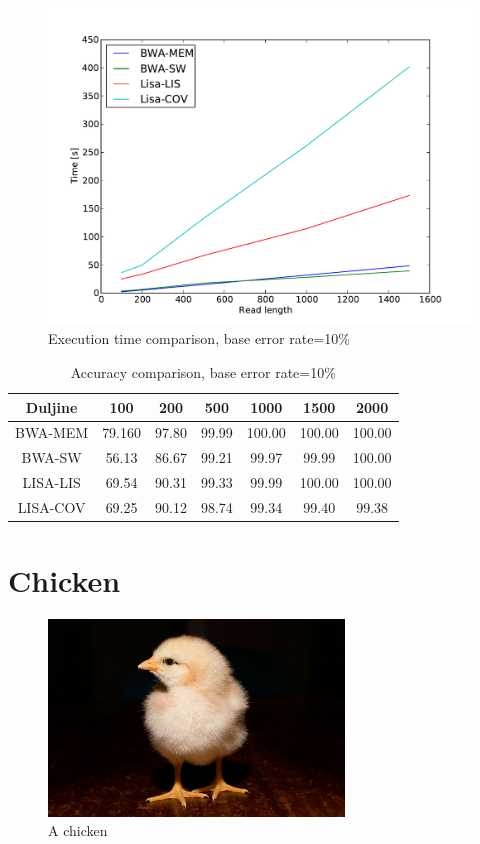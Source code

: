 \documentclass[times, utf8, diplomski]{fer}
\begin{document}
\begin{figure}[H]
\centering
\includegraphics[width=1.0\textwidth]{../img/banana-e10-time.pdf}
\caption{Execution time comparison, base error rate=10\%}\label{banana-e10-time}
\end{figure}

\begin{table}[H]
\centering
\begin{tabular}{|c||c|c|c|c|c|c|}
\hline
	Duljine & 100 & 200 & 500 & 1000 & 1500 & 2000\\
\hline
\hline
	BWA-MEM & 79.160 & 97.80 & 99.99 & 100.00 & 100.00 & 100.00\\
\hline
	BWA-SW  & 56.13 & 86.67 & 99.21 & 99.97 & 99.99 & 100.00\\
\hline
	LISA-LIS   & 69.54 & 90.31 & 99.33 & 99.99 & 100.00 & 100.00\\
\hline
	LISA-COV  & 69.25 & 90.12 & 98.74 & 99.34 & 99.40 & 99.38\\
\hline
\end{tabular}
\caption{Accuracy comparison, base error rate=10\%}\label{banana-e10-correct}
\end{table}


\section{Chicken}

\begin{figure}[H]
\centering
\includegraphics[width=0.7\textwidth]{../img/Day_old_chick_black_background.jpg}
\caption{A chicken}\label{banana}
\end{figure}
\end{document}
